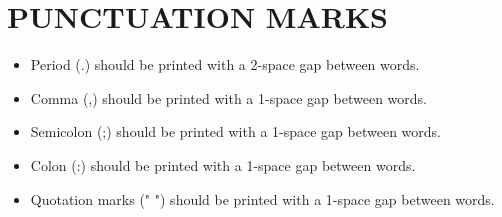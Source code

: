\section{PUNCTUATION MARKS}

\begin{itemize}
    \item Period (.) should be printed with a 2-space gap between words.
    \item Comma (,) should be printed with a 1-space gap between words.
    \item Semicolon (;) should be printed with a 1-space gap between words.
    \item Colon (:) should be printed with a 1-space gap between words.
    \item Quotation marks (" ") should be printed with a 1-space gap between words.
\end{itemize}